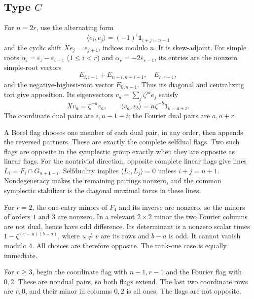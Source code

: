 \documentclass[11pt]{article}
\theoremstyle{definition}\newtheorem{definition}[theorem]{Definition}
\theoremstyle{remark}\newtheorem{remark}[theorem]{Remark}
\begin{document}
\subsection{Type \texorpdfstring{$C$}{C}}
For $n=2r$, use the alternating form
\[
 \langle e_i,e_j\rangle=(-1)^i\mathbf1_{i+j=n-1}
\]
and the cyclic shift $Xe_j=e_{j+1}$, indices modulo $n$. It is skew-adjoint. For simple roots $\alpha_i=\varepsilon_i-\varepsilon_{i-1}$ ($1\leq i<r$) and $\alpha_r=-2\varepsilon_{r-1}$, its entries are the nonzero simple-root vectors
\[
 E_{i,i-1}+E_{n-i,n-i-1},\quad E_{r,r-1},
\]
and the negative-highest-root vector $E_{0,n-1}$. Thus its diagonal and centralizing tori give apposition. Its eigenvectors $v_a=\sum_j\zeta^{ja}e_j$ satisfy
\[
 Xv_a=\zeta^{-a}v_a,\qquad
 \langle v_a,v_b\rangle=n\zeta^{-b}\mathbf1_{b=a+r}.
\]
The coordinate dual pairs are $i,n-1-i$; the Fourier dual pairs are $a,a+r$.

A Borel flag chooses one member of each dual pair, in any order, then appends the reversed partners. These are exactly the complete selfdual flags. Two such flags are opposite in the symplectic group exactly when they are opposite as linear flags. For the nontrivial direction, opposite complete linear flags give lines $L_i=F_i\cap G_{n+1-i}$. Selfduality implies $\langle L_i,L_j\rangle=0$ unless $i+j=n+1$. Nondegeneracy makes the remaining pairings nonzero, and the common symplectic stabilizer is the diagonal maximal torus in these lines.

For $r=2$, the one-entry minors of $F_4$ and its inverse are nonzero, so the minors of orders $1$ and $3$ are nonzero. In a relevant $2\times2$ minor the two Fourier columns are not dual, hence have odd difference. Its determinant is a nonzero scalar times $1-\zeta^{(v-u)(b-a)}$, where $u\ne v$ are its rows and $b-a$ is odd. It cannot vanish modulo $4$. All choices are therefore opposite. The rank-one case is equally immediate.

For $r\geq3$, begin the coordinate flag with $n-1,r-1$ and the Fourier flag with $0,2$. These are nondual pairs, so both flags extend. The last two coordinate rows are $r,0$, and their minor in columns $0,2$ is all ones. The flags are not opposite.
\end{document}
